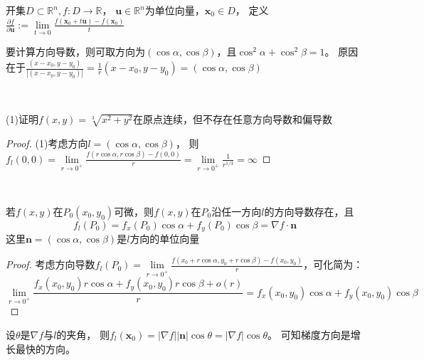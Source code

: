 \begin{definition}[方向导数]
  开集$D \subset \mathbb{R}^n, f:D \rightarrow \mathbb{R}$，
  $\mathbf{u} \in \mathbb{R}^n$为单位向量，$\mathbf{x}_0 \in D$，
  定义$\frac{\partial f}{\partial \mathbf{u}} := \lim \limits _{t \rightarrow 0} \frac{f(\mathbf{x}_0 + t\mathbf{u}) - f(\mathbf{x}_0)}{t}$
\end{definition}

\begin{note}
  要计算方向导数，则可取方向为$(\cos \alpha, \cos \beta)$，且$\cos^2\alpha + \cos^2\beta = 1$。
  原因在于$\frac{(x - x_0, y - y_0)}{|(x-x_0,y-y_0)|} = \frac{1}{r}(x - x_0,y - y_0) = (\cos \alpha, \cos \beta)$
\end{note}

~

\begin{exercise}[常用反例]
  (1)证明$f(x,y) = \sqrt[3]{x^2 + y^2}$在原点连续，但不存在任意方向导数和偏导数
\end{exercise}

\begin{proof}
  (1)考虑方向$l = (\cos \alpha, \cos \beta)$，
  则$f_l(0,0) = \lim \limits _{r \rightarrow 0^+}\frac{f(r \cos \alpha, r\cos \beta) - f(0,0)}{r} = \lim \limits _{r \rightarrow 0^+} \frac{1}{r^{1/3}} = \infty$
\end{proof}

~

\begin{theorem}[可微函数方向导数的梯度表达]
  若$f(x,y)$在$P_0(x_0,y_0)$可微，则$f(x,y)$在$P_0$沿任一方向$l$的方向导数存在，且
  \begin{equation*}
    f_l(P_0) = f_x(P_0)\cos \alpha + f_y(P_0)\cos \beta = \nabla f \cdot \mathbf{n}
  \end{equation*}
  这里$\mathbf{n} = (\cos \alpha, \cos \beta)$是$l$方向的单位向量
\end{theorem}

\begin{proof}
  考虑方向导数$f_l(P_0) = \lim \limits _{r \rightarrow 0^+} \frac{f(x_0 + r\cos \alpha , y_0 + r \cos \beta) - f(x_0,y_0)}{r}$，可化简为：
  \begin{equation*}
     \lim \limits _{r \rightarrow 0^+} \frac{f_x(x_0,y_0) r \cos \alpha + f_y(x_0,y_0)r \cos \beta + o(r)}{r} = f_x(x_0,y_0) \cos \alpha + f_y(x_0,y_0)\cos \beta
  \end{equation*}
\end{proof}

\begin{note}
  设$\theta$是$\nabla f$与$l$的夹角，
  则$f_l(\mathbf{x}_0) = |\nabla f| |\mathbf{n}| \cos \theta = |\nabla f| \cos \theta$。
  可知梯度方向是增长最快的方向。
\end{note}

